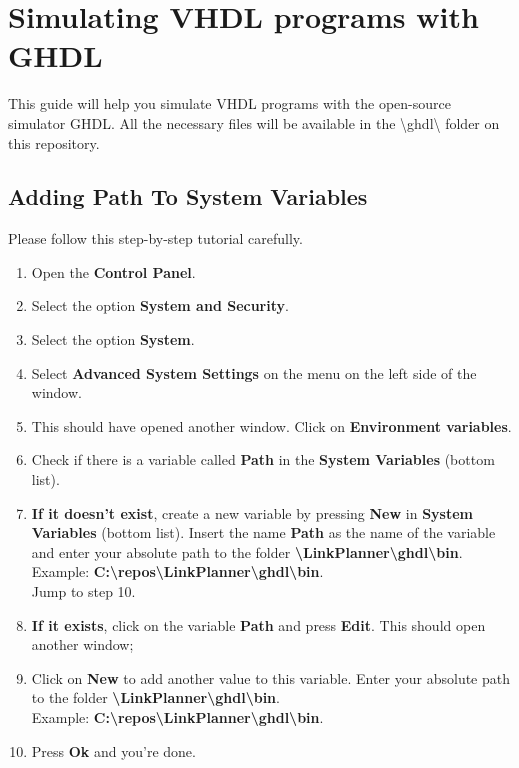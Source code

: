 \chapter{Simulating VHDL programs with GHDL}

This guide will help you simulate VHDL programs with the open-source simulator GHDL.
All the necessary files will be available in the \textbackslash{}ghdl\textbackslash{} folder on this repository.

\section{Adding Path To System Variables}
Please follow this step-by-step tutorial carefully.
  \begin{enumerate}
    \item Open the \textbf{Control Panel}.
    \item Select the option \textbf{System and Security}.
    \item Select the option \textbf{System}.
    \item Select \textbf{Advanced System Settings} on the menu on the left side of the window.
    \item This should have opened another window. Click on \textbf{Environment variables}.
    \item Check if there is a variable called \textbf{Path} in the \textbf{System Variables} (bottom list).
    \item \textbf{If it doesn't exist}, create a new variable by pressing \textbf{New} in \textbf{System Variables} (bottom list). Insert the name \textbf{Path} as the name of the variable and enter your absolute path to the folder \textbf{\textbackslash{}LinkPlanner\textbackslash{}ghdl\textbackslash{}bin}.\\ Example: 
        \textbf{C:\textbackslash{}repos\textbackslash{}LinkPlanner\textbackslash{}ghdl\textbackslash{}bin}.\\
          Jump to step 10.
    \item \textbf{If it exists}, click on the variable \textbf{Path} and press \textbf{Edit}. This should open another window;
    \item Click on \textbf{New} to add another value to this variable. Enter your absolute path to the folder \textbf{\textbackslash{}LinkPlanner\textbackslash{}ghdl\textbackslash{}bin}.\\ Example: 
        \textbf{C:\textbackslash{}repos\textbackslash{}LinkPlanner\textbackslash{}ghdl\textbackslash{}bin}.\\
    \item Press \textbf{Ok} and you're done.
  \end{enumerate}
\pagebreak
